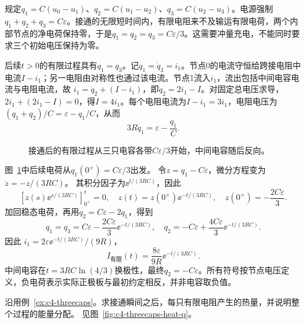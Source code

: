 \begin{solution}
规定$q_1=C(u_0-u_1)$、$q_2=C(u_1-u_2)$、$q_3=C(u_2-u_3)$。电源强制$q_1+q_2+q_3=C\varepsilon$。接通的无限短时间内，有限电阻来不及输运有限电荷，两个内部节点的净电荷保持零，于是$q_1=q_2=q_3=C\varepsilon/3$。这需要冲量充电，不能同时要求三个初始电压保持为零。

后续$t>0$的有限过程具有$q_1=q_3$。记$\dot q_1=\dot q_3=i_1$。节点0的电流守恒给跨接电阻中电流$I-i_1$；另一电阻由对称性也通过该电流。节点1流入$i_1$，流出包括中间电容电流与电阻电流，故
$i_1=\dot q_2+(I-i_1)$，即$\dot q_2=2i_1-I$。对固定总电压求导，
$2i_1+(2i_1-I)=0$，得$I=4i_1$。每个电阻电流为$I-i_1=3i_1$，电阻电压为
$(q_1+q_2)/C=\varepsilon-q_1/C$，从而
\[
 3R\dot q_1=\varepsilon-\frac{q_1}C.
\]

\begin{figure}[H]\centering
{}
\caption{接通后的有限过程从三只电容各带$C\varepsilon/3$开始，中间电容随后反向。}\label{fig:c4-threecaps-s}
\end{figure}

图~\ref{fig:c4-threecaps-s}中后续电荷从$q_1(0^+)=C\varepsilon/3$出发。
令$z=q_1-C\varepsilon$，微分方程变为$\dot z=-z/(3RC)$。
其积分因子为$\ee^{t/(3RC)}$，因此
\[
 [z(s)\ee^{s/(3RC)}]_{0^+}^{t}=0,
 \quad z(t)=z(0^+)\ee^{-t/(3RC)},\quad z(0^+)=-\frac{2C\varepsilon}3.
\]
加回稳态电荷，再用$q_2=C\varepsilon-2q_1$，得到
\[
 \boxed{q_1=q_3=C\varepsilon
 -\frac{2C\varepsilon}3\ee^{-t/(3RC)}},
\quad
 q_2=-C\varepsilon+\frac{4C\varepsilon}3\ee^{-t/(3RC)}.
\]
因此
$i_1=2\varepsilon\ee^{-t/(3RC)}/(9R)$，
\[
 \boxed{I_{\text{有限}}(t)=\frac{8\varepsilon}{9R}
 \ee^{-t/(3RC)}}.
\]
中间电容在$t=3RC\ln(4/3)$换极性，最终$q_2=-C\varepsilon$。所有符号按节点电压定义，负电荷表示实际正极板与最初约定相反，并非电容取负值。
\end{solution}

\begin{example}[不用时间函数求电阻热量]\label{ex:c4-threecaps-heat}
沿用例~\ref{ex:c4-threecaps}。求接通瞬间之后，每只有限电阻产生的热量，并说明整个过程的能量分配。 见图~\ref{fig:c4-threecaps-heat-q}。
\end{example}


